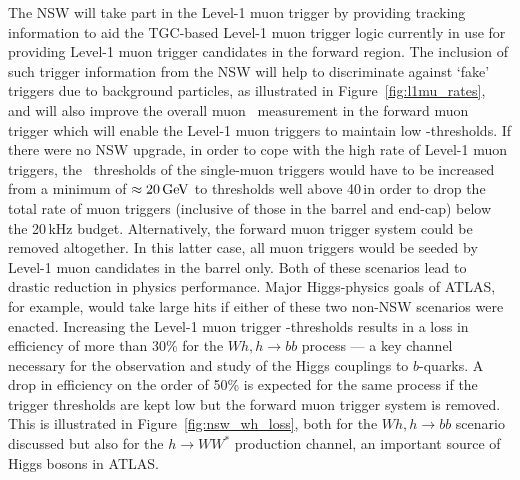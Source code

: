 The NSW will take part in the Level-1 muon trigger by providing
tracking information to aid the TGC-based Level-1 muon trigger logic currently in use for providing
Level-1 muon trigger candidates in the forward region.
The inclusion of such trigger information from the NSW will help to discriminate against
`fake' triggers due to background particles, as illustrated in Figure~\ref{fig:l1mu_rates},
and will also improve the overall muon \pT~measurement in the forward muon trigger which
will enable the Level-1 muon triggers to maintain low \pT-thresholds.
If there were no NSW upgrade, in order to cope with the high rate of Level-1 muon triggers,
the \pT~thresholds of the single-muon triggers would have to be increased from a minimum of $\approx20\,\text{Ge\kern -0.1em V}$
to thresholds well above 40\,\GeV in order to drop the total rate of muon triggers (inclusive of those
in the barrel and end-cap) below the 20\,kHz budget.
Alternatively, the forward muon trigger system could be removed altogether.
In this latter case, all muon triggers would be seeded by Level-1 muon candidates in the barrel only.
Both of these scenarios lead to drastic reduction in physics performance.
Major Higgs-physics goals of ATLAS, for example, would take large hits if either of these
two non-NSW scenarios were enacted.
Increasing the Level-1 muon trigger \pT-thresholds results in a loss in efficiency of more than
30\% for the $Wh,h\rightarrow bb$ process --- a key channel necessary for the observation and study
of the Higgs couplings to $b$-quarks.
A drop in efficiency on the order of 50\% is expected for the same process if the trigger thresholds
are kept low but the forward muon trigger system is removed.
This is illustrated in Figure~\ref{fig:nsw_wh_loss}, both for the $Wh,h\rightarrow bb$ scenario
discussed but also for the $h\rightarrow WW^*$ production channel, an important source of Higgs bosons
in ATLAS.


